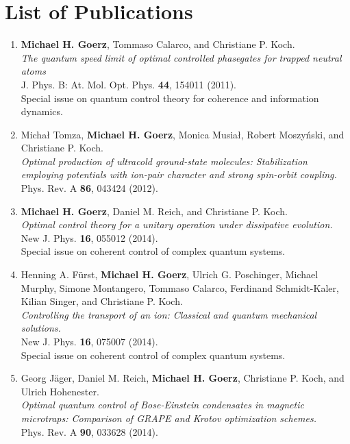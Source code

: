 \chapter{List of Publications}
\label{AppendixPubs}

\begin{enumerate}

  \item
  {\bf Michael H. Goerz}, Tommaso Calarco, and Christiane P. Koch. \\
  {\it The quantum speed limit of optimal controlled phasegates for trapped neutral atoms} \\
  J. Phys. B: At. Mol. Opt. Phys. {\bf 44}, 154011 (2011). \\
  Special issue on quantum control theory for coherence and information dynamics.
  \label{GoerzJPB2011}

  \item
  Michał Tomza, {\bf Michael H. Goerz}, Monica Musiał, Robert Moszyński, and Christiane P. Koch. \\
  {\it Optimal production of ultracold ground-state molecules: Stabilization employing potentials with ion-pair character and strong spin-orbit coupling.}  \\
  Phys. Rev. A {\bf 86}, 043424 (2012).
  \label{TomzaPRA2012}

  \item
  {\bf Michael H. Goerz}, Daniel M. Reich, and Christiane P. Koch. \\
  {\it Optimal control theory for a unitary operation under dissipative evolution.} \\
  New J. Phys. {\bf 16}, 055012 (2014).  \\
  Special issue on coherent control of complex quantum systems.
  \label{GoerzNJP2014}

  \newpage
  \item
  Henning A. Fürst, {\bf Michael H. Goerz}, Ulrich G. Poschinger, Michael Murphy, Simone Montangero, Tommaso Calarco, Ferdinand Schmidt-Kaler, Kilian Singer, and Christiane P. Koch. \\
  {\it Controlling the transport of an ion: Classical and quantum mechanical solutions.} \\
  New J. Phys. {\bf 16}, 075007 (2014). \\
  Special issue on coherent control of complex quantum systems.
  \label{FuerstNJP2014}

  \item
  Georg Jäger, Daniel M. Reich, {\bf Michael H. Goerz}, Christiane P. Koch, and Ulrich Hohenester. \\
  {\it Optimal quantum control of Bose-Einstein condensates in magnetic microtraps: Comparison of GRAPE and Krotov optimization schemes.} \\
  Phys. Rev. A {\bf 90}, 033628 (2014).
  \label{JaegerPRA2014}


\end{enumerate}
